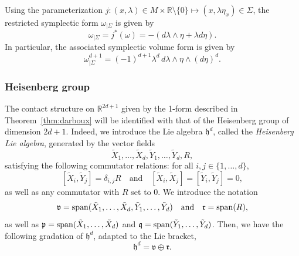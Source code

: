 \documentclass[12pt,a4paper]{amsart}
\theoremstyle{plain}
\theoremstyle{definition}
\theoremstyle{remark}
\numberwithin{equation}{section}
\theoremstyle{definition}
\def\R{{\mathbb R}}%
\def \fh{\mathfrak{h}}
\def \fv{\mathfrak{v}}
\def \fr{\mathfrak{r}}
\numberwithin{equation}{section}
\begin{document}
Using the parameterization $j:(x,\lambda)\in M\times \R\setminus\{0\}\mapsto (x,\lambda\eta_x)\in\Sigma$, the restricted symplectic form $\omega_{|\Sigma}$ is given by 
\begin{equation*}
    \omega_{|\Sigma} = j^*(\omega) = -(d\lambda \wedge \eta + \lambda d\eta).
\end{equation*}
In particular, the associated symplectic volume form is given by 
\begin{equation}
    \label{eq:symplecticvolume}
    \omega_{|\Sigma}^{d+1} = (-1)^{d+1} \lambda^{d}\,d\lambda\wedge \eta \wedge (d\eta)^d.
\end{equation}

\subsubsection{Heisenberg group}
\label{subsubsect:heisenberg}

The contact structure on $\R^{2d+1}$ given by the 1-form described in Theorem~\ref{thm:darboux} will be identified with that of the Heisenberg group of dimension $2d+1$.
Indeed, we introduce the Lie algebra $\fh^d$, called the \emph{Heisenberg Lie algebra}, generated by the vector fields 
\begin{equation*}
 \tilde{X}_1,\dots,\tilde{X}_d,\tilde{Y}_1,\dots,\tilde{Y}_d,R,
\end{equation*}
satisfying the following commutator relations: for all $i,j\in\{1,\dots,d\}$, 
\begin{equation}
\label{eq:heisenbergrelations}
 [\tilde{X}_i,\tilde{Y}_j] = \delta_{i,j}R\quad\mbox{and}\quad [\tilde{X}_i,\tilde{X}_j] = [\tilde{Y}_i,\tilde{Y}_j] = 0,
\end{equation}
as well as any commutator with $R$ set to 0. We introduce the notation 
\begin{equation*}
 \fv = {\rm span}(\tilde{X}_1,\dots,\tilde{X}_d,\tilde{Y}_1,\dots,\tilde{Y}_d)\quad\mbox{and}\quad \fr = {\rm span}(R),
\end{equation*}
as well as $\mathfrak{p} = {\rm span}(\tilde{X}_1,\dots,\tilde{X}_d)$ and $\mathfrak{q} = {\rm span}(\tilde{Y}_1,\dots,\tilde{Y}_d)$. Then, we have the following gradation of $\fh^d$, adapted to the Lie bracket,
\begin{equation}
\label{eq:stratificationHeis}
 \fh^d = \fv \oplus \fr.
\end{equation}
\end{document}
